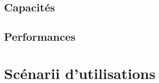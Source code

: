 \documentclass[12pt,a4paper,openany]{article}
\begin{document}
	\subsection{Capacités}
	\subsection{Performances}

	\section{Scénarii d'utilisations}
	\appendix
	\listoffigures
\end{document}

